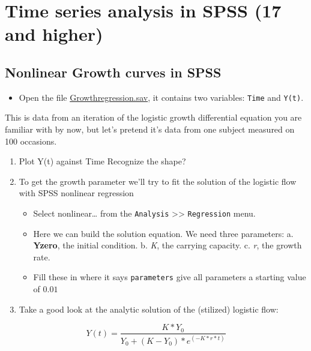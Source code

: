 \documentclass[]{book}
\providecommand{\tightlist}{%
  \setlength{\itemsep}{0pt}\setlength{\parskip}{0pt}}
\let\stdsection\section
\renewcommand\section{\newpage\stdsection}
\begin{document}
\section{Time series analysis in SPSS (17 and
higher)}\label{time-series-analysis-in-spss-17-and-higher}

\hypertarget{bta}{\subsection{Nonlinear Growth curves in
SPSS}\label{bta}}

\begin{itemize}
\tightlist
\item
  Open the file
  \href{https://github.com/FredHasselman/DCS/blob/master/assignmentData/BasicTSA_nonlinreg/GrowthRegression.sav}{Growthregression.sav},
  it contains two variables: \texttt{Time} and \texttt{Y(t)}.
\end{itemize}

This is data from an iteration of the logistic growth differential
equation you are familiar with by now, but let's pretend it's data from
one subject measured on 100 occasions.

\begin{enumerate}
\def\labelenumi{\arabic{enumi}.}
\tightlist
\item
  Plot Y(t) against Time Recognize the shape?
\item
  To get the growth parameter we'll try to fit the solution of the
  logistic flow with SPSS nonlinear regression

  \begin{itemize}
  \tightlist
  \item
    Select nonlinear\ldots{} from the \texttt{Analysis}
    \textgreater{}\textgreater{} \texttt{Regression} menu.
  \item
    Here we can build the solution equation. We need three parameters:
    a. \textbf{Yzero}, the initial condition. b. \emph{K}, the carrying
    capacity. c. \emph{r}, the growth rate.
  \item
    Fill these in where it says \texttt{parameters} give all parameters
    a starting value of \(0.01\)
  \end{itemize}
\item
  Take a good look at the analytic solution of the (stilized) logistic
  flow:
\end{enumerate}

\[
Y(t)  =  \frac{K * Y_0}{Y_0 + \left(K-Y_{0}\right) * e^{(-K*r*t)} }
\]
\end{document}
